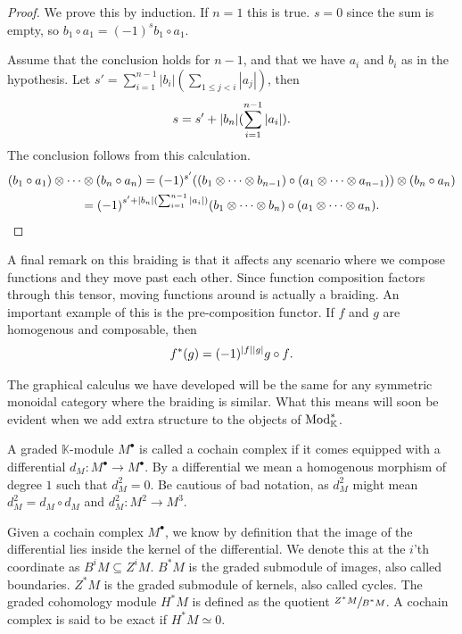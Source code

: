 \documentclass[../thesis.tex]{subfiles}
\begin{document}
            \begin{proof}
                We prove this by induction. If $n=1$ this is true. $s = 0$ since the sum is empty, so $b_1 \circ a_1  =(-1)^s b_1 \circ a_1$.
                
                Assume that the conclusion holds for $n-1$, and that we have $a_i$ and $b_i$ as in the hypothesis. Let $s' = \sum_{i=1}^{n-1}|b_i|(\sum_{1\leq j < i}|a_j|)$, then
                \begin{align*}
                    s = s' + |b_n|(\sum_{i = 1}^{n-1}|a_i|)\tt{.}
                \end{align*}
                The conclusion follows from this calculation.
                \begin{multline*}
                    (b_1 \circ a_1) \otimes \cdots \otimes (b_n \circ a_n) = (-1)^{s'}((b_1 \otimes \cdots \otimes b_{n-1}) \circ (a_1 \otimes \cdots \otimes a_{n-1})) \otimes (b_n \circ a_n) \\ = (-1)^{s' + |b_n|(\sum_{i = 1}^{n-1}|a_i|)}(b_1 \otimes \cdots \otimes b_n) \circ (a_1 \otimes \cdots \otimes a_n)\tt{.}
                \end{multline*}
            \end{proof}

            A final remark on this braiding is that it affects any scenario where we compose functions and they move past each other. Since function composition factors through this tensor, moving functions around is actually a braiding. An important example of this is the pre-composition functor. If $f$ and $g$ are homogenous and composable, then
            \begin{align*}
                f^*(g) = (-1)^{|f||g|}g\circ f\tt{.}
            \end{align*}

            The graphical calculus we have developed will be the same for any symmetric monoidal category where the braiding is similar. What this means will soon be evident when we add extra structure to the objects of $\tt{Mod}_\mathbb{K}^*$.

            A graded $\mathbb{K}$-module $M^\bullet$ is called a cochain complex if it comes equipped with a differential $d_M : M^\bullet \rightarrow M^\bullet$. By a differential we mean a homogenous morphism of degree $1$ such that $d_M^2 = 0$. Be cautious of bad notation, as $d^2_M$ might mean $d^2_M = d_M \circ d_M$ and $d^2_M : M^2 \rightarrow M^3$.

            Given a cochain complex $M^\bullet$, we know by definition that the image of the differential lies inside the kernel of the differential. We denote this at the $i$'th coordinate as $B^iM \subseteq Z^iM$. $B^*M$ is the graded submodule of images, also called boundaries. $Z^*M$ is the graded submodule of kernels, also called cycles. The graded cohomology module $H^*M$ is defined as the quotient $\sfrac{Z^*M}{B^*M}$. A cochain complex is said to be exact if $H^*M \simeq 0$.
\end{document}
